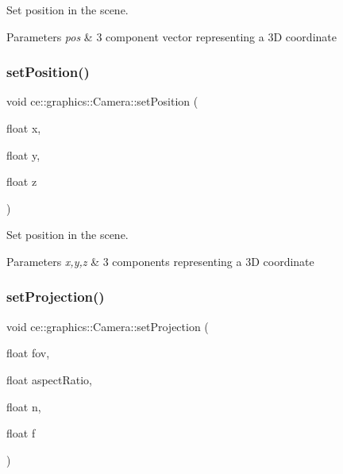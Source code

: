 Set position in the scene. 


\begin{DoxyParams}{Parameters}
{\em pos} & 3 component vector representing a 3D coordinate \\
\hline
\end{DoxyParams}
\mbox{\label{classce_1_1graphics_1_1_camera_ad993b93d1a746100d5f014070abb438b}} 
\subsubsection{\texorpdfstring{set\+Position()}{setPosition()}\hspace{0.1cm}{\footnotesize\ttfamily [2/2]}}
{\footnotesize\ttfamily void ce\+::graphics\+::\+Camera\+::set\+Position (\begin{DoxyParamCaption}\item[{float}]{x,  }\item[{float}]{y,  }\item[{float}]{z }\end{DoxyParamCaption})}



Set position in the scene. 


\begin{DoxyParams}{Parameters}
{\em x,y,z} & 3 components representing a 3D coordinate \\
\hline
\end{DoxyParams}
\mbox{\label{classce_1_1graphics_1_1_camera_a6145b8ef21c58b4426d2400aac9cefbf}} 
\subsubsection{\texorpdfstring{set\+Projection()}{setProjection()}}
{\footnotesize\ttfamily void ce\+::graphics\+::\+Camera\+::set\+Projection (\begin{DoxyParamCaption}\item[{float}]{fov,  }\item[{float}]{aspect\+Ratio,  }\item[{float}]{n,  }\item[{float}]{f }\end{DoxyParamCaption})}



